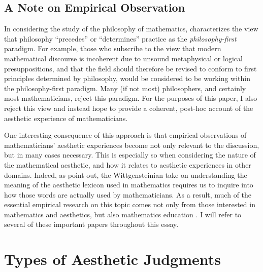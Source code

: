 \documentclass[a4paper,man,natbib]{apa6}
\begin{document}
\subsection{A Note on Empirical Observation}

In considering the study of the philosophy of mathematics, \cite{shapiro_thinking_2000} characterizes
the view that philosophy ``precedes'' or ``determines'' practice as the \textit{philosophy-first} paradigm.
For example, those who subscribe to the view that modern mathematical discourse is incoherent due to unsound
metaphysical or logical presuppositions, and that the field should therefore be revised to conform to
first principles determined by philosophy, would be considered to be working within the philosophy-first
paradigm. Many (if not most) philosophers, and certainly most mathematicians, reject this paradigm. For the
purposes of this paper, I also reject this view and instead hope to provide a coherent, post-hoc account
of the aesthetic experience of mathematicians. 

One interesting consequence of this approach is that empirical observations of mathematicians' aesthetic experiences
become not only relevant to the discussion, but in many cases necessary. This is especially so when considering the 
nature of the mathematical aesthetic, and how it relates to aesthetic experiences in other domains. Indeed, as
\cite{inglis_beauty_2015} point out, the Wittgensteinian take on understanding the meaning of the aesthetic lexicon 
used in mathematics requires us to inquire into how those words are actually used by mathematicians. As a result, 
much of the essential empirical research on this topic comes not only from those interested in mathematics and aesthetics, 
but also mathematics education \citep{dreyfus_aesthetics_1986,inglis_beauty_2015,larvor_diversity_2016,inglis_are_2020,
sa_mathematicians_2023}. I will refer to several of these important papers throughout this essay.

\section{Types of Aesthetic Judgments}
\end{document}
